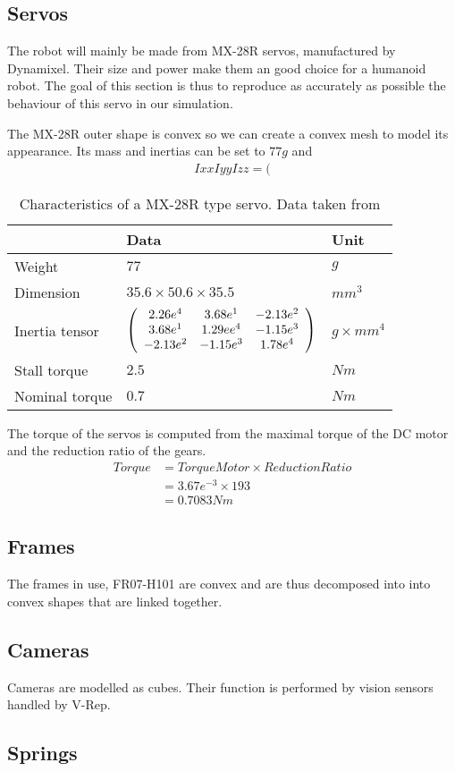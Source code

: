 \subsection{Servos}
The robot will mainly be made from MX-28R servos, manufactured by Dynamixel. Their size and power make them an good choice for a humanoid robot. The goal of this section is thus to reproduce as accurately as possible the behaviour of this servo in our simulation.

The MX-28R outer shape is convex so we can create a convex mesh to model its appearance. Its mass and inertias can be set to $77g$ and 
\begin{align*}
Ixx Iyy Izz = (
\end{align*}

\begin{table}[htp]
\center
\begin{tabularx}{\textwidth}{@{} l l l @{}}
\toprule
& \textbf{Data} & \textbf{Unit}\\ 
\midrule
Weight & $77$ & $g$\\
Dimension & $35.6 \times 50.6 \times 35.5$ & $mm^3$\\
Inertia tensor & $\left(\begin{array}{c c c}
2.26e^4 & 3.68e^1 & -2.13e^2\\
3.68e^1 & 1.29ee^4 & -1.15e^3\\
-2.13e^2 & -1.15e^3 & 1.78e^4\\
\end{array}\right)$ & $g \times mm^4$ \\
Stall torque & $2.5$ & $Nm$\\
Nominal torque & $0.7$ & $Nm$\\
\bottomrule
\end{tabularx}
\caption{Characteristics of a MX-28R type servo. Data taken from \cite{mx_28_manual}}
\label{table:specs}
\end{table}

The torque of the servos is computed from the maximal torque of the DC motor and the reduction ratio of the gears. 
\begin{align*}
Torque &= TorqueMotor \times ReductionRatio\\
&= 3.67e^{-3} \times 193\\
&= 0.7083Nm
\end{align*} 

\subsection{Frames}
The frames in use, FR07-H101 are convex and are thus decomposed into into convex shapes that are linked together. 

\subsection{Cameras}
Cameras are modelled as cubes. Their function is performed by vision sensors handled by V-Rep.

\subsection{Springs}

